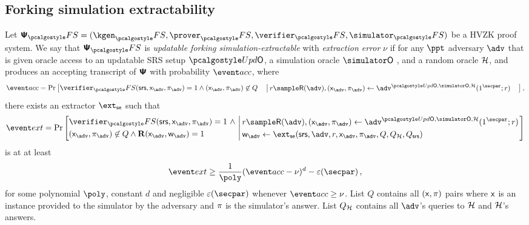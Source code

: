 \subsection{Forking simulation extractability}
\begin{definition}
	\label{def:updsimext}
	Let $\ps_\fs = (\kgen_\fs, \prover_\fs, \verifier_\fs, \simulator_\fs)$ be a
	HVZK proof system. We say that $\ps_\fs$ is \emph{updatable forking
		simulation-extractable} with \emph{extraction error} $\nu$ if for any $\ppt$
	adversary $\adv$ that is given oracle access to an updatable SRS setup $\initU$, a simulation oracle $\simO$ , and a random oracle $\mathcal{H}$, and produces an accepting transcript of $\bm{\mathsf{\Psi}}$ with
	probability $\accProb$, where
	\[
	\accProb = \Pr \left[
	\begin{aligned}
	& \verifier_\fs(\srs, \inp_{\advse}, \zkproof_{\advse}) = 1 \wedge
	(\inp_{\advse}, \zkproof_{\advse}) \not\in Q
	\end{aligned}
	\left| \,
	\begin{aligned}
	& r \sample \RND{\advse},
	(\inp_{\advse}, \zkproof_{\advse}) \gets \advse^{\initU, \simO,
		\ro} (1^\secpar; r)
	\end{aligned}
	\right.\right],
	\]
	there exists an extractor $\extse$ such that
	\[
	\extProb = \Pr \left[
	\begin{aligned}
	& \verifier_\fs(\srs, \inp_{\advse}, \zkproof_{\advse}) = 1 \ \wedge \\
	& (\inp_{\advse}, \zkproof_{\advse}) \not\in Q \wedge
	\REL(\inp_{\advse}, \wit_{\advse}) = 1
	\end{aligned}
	\, \left| \,
	\begin{aligned}
	& r \sample \RND{\advse},
	(\inp_{\advse}, \zkproof_{\advse}) \gets \advse^{\initU, \simO,
		\ro} (1^\secpar; r) \\
	& \wit_{\advse} \gets \ext_\se (\srs, \advse, r, \inp_{\advse}, \zkproof_{\advse},
	Q, Q_\ro, Q_\srs) 
	\end{aligned}
	\right.\right]
	\]
	is at at least 
	\[
	\extProb \geq \frac{1}{\poly} (\accProb - \nu)^d - \eps(\secpar)\,,
	\]
	for some polynomial $\poly$, constant $d$ and negligible $\eps(\secpar)$ whenever
	$\accProb \geq \nu$. 
	List $Q$ contains all $(\mathsf{x}, \pi)$ pairs where 
	$\mathsf{x}$ is an instance provided to the simulator by the adversary and
	$\pi$ is the simulator's answer. List $Q_{\mathcal{H}}$ contains all $\advse$'s
	queries to $\mathcal{H}$ and $\mathcal{H}$'s answers. 
\end{definition}
